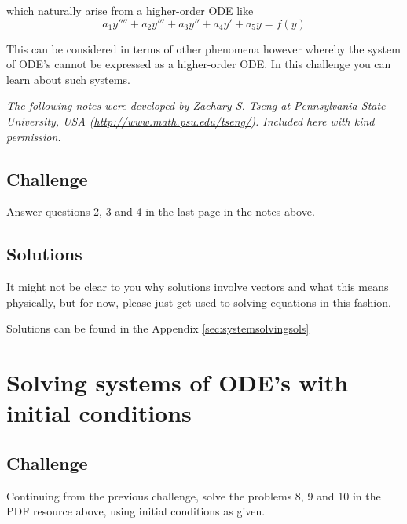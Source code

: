 which naturally arise from a higher-order ODE like
\begin{equation}
    a_1 y'''' + a_2 y''' + a_3 y'' + a_4 y' + a_5 y = f(y)
\end{equation}

This can be considered in terms of other phenomena however whereby the system of ODE's cannot be expressed as a higher-order ODE. In this challenge you can learn about such systems.

\emph{The following notes were developed by Zachary S. Tseng at Pennsylvania State University, USA (\url{http://www.math.psu.edu/tseng/}). Included here with kind permission.}



\subsection*{Challenge}
\label{sec:systemsolvingchallenges}
Answer questions 2, 3 and 4 in the last page in the notes above.

\subsection*{Solutions}
It might not be clear to you why solutions involve vectors and what this means physically, but for now, please just get used to solving equations in this fashion.

Solutions can be found in the Appendix \ref{sec:systemsolvingsols}






\newpage
\section{Solving systems of ODE's with initial conditions}
\label{sec:systemsolvinginit}

\subsection*{Challenge}
\label{sec:systemsolvinginitchallenges}
Continuing from the previous challenge, solve the problems 8, 9 and 10 in the PDF resource above, using initial conditions as given.

